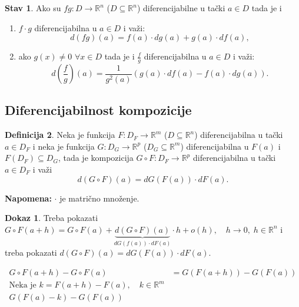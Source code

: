 \documentclass[11pt]{article}
\newcommand{\real}{\mathbb{R}}
\theoremstyle{definition}
\newtheorem{definicija}{Definicija}[section]
\newtheorem{stav}[definicija]{Stav}
\theoremstyle{serbnodot}
\newtheorem*{dokaz}{Dokaz}
\newcommand{\napomena}[1]{%
    \textbf{Napomena:} #1
}
\begin{document}
\begin{stav}
    Ako su \(fg: D \to \mathbb{R}^n\) (\(D \subseteq \mathbb{R}^n\)) diferencijabilne
    u tački \(a \in D\) tada je i
    \begin{enumerate}
        \item \(f \cdot g\) diferencijabilna u \(a \in D\) i važi:
        \[
            d(fg)(a) = f(a) \cdot dg(a) + g(a) \cdot df(a),
        \]
        \item ako \(g(x) \neq 0\) \(\forall x \in D\) tada je i \(\frac{f}{g}\)
        diferencijabilna u \(a \in D\) i važi:
        \[
            d\left(\frac{f}{g}\right)(a) = \frac{1}{g^2(a)}(g(a)\cdot df(a) - f(a) \cdot dg(a)).
        \]
    \end{enumerate}
\end{stav}

\subsection{Diferencijabilnost kompozicije}


\begin{definicija}
    Neka je funkcija \(F:D_F \to \mathbb{R}^m\) (\(D \subseteq \mathbb{R}^n\)) diferencijabilna
    u tački \(a \in D_F\) i neka je funkcija \(G: D_G \to \mathbb{R}^p\) 
    (\(D_G \subseteq \mathbb{R}^m\)) diferencijabilna u \(F(a)\) i \(F(D_F) \subseteq D_G\),
    tada je kompozicija \(G \circ F: D_F \to \mathbb{R}^p \) diferencijabilna u tački
    \(a \in D_F\) i važi
    \[
        d(G \circ F)(a) = dG(F(a)) \cdot dF(a).
    \]
\end{definicija}
\napomena{\(\cdot\) je matrično množenje.}
\begin{dokaz}
    Treba pokazati \( G \circ F (a+h) = G\circ F(a) + 
    \underbrace{d(G\circ F)(a)}_{dG(f(a)) \cdot dF(a)} \cdot h + o(h),
    \quad h \to 0, \; h \in \real^n\) i treba pokazati
    \(d(G\circ F)(a) = dG(F(a)) \cdot dF(a).\)

    \begin{align*}
        G\circ F(a+h) - G\circ F(a) &= G(F(a+h)) - G(F(a)) \\
        \text{Neka je } k = F(a+h) - F(a), \quad k \in \real^m \\
        G(F(a) - k) - G(F(a))& \\
    \end{align*}
\end{dokaz}
\end{document}
